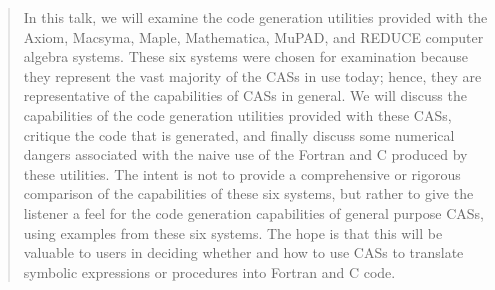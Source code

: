 \documentclass[11pt]{article}
\begin{document}
\begin{abstract}
In this talk, we will examine the code generation utilities provided with the
Axiom, Macsyma, Maple, Mathematica, MuPAD, and REDUCE computer algebra 
systems.  These six systems were chosen for examination because they 
represent the vast majority of the CASs in use 
today; hence, they are representative of the capabilities of
CASs in general.
We will discuss the capabilities of the code generation 
utilities provided with these CASs, critique the 
code that is generated, and finally discuss some numerical dangers 
associated with the naive use of the Fortran and C produced by these 
utilities.  The intent is not to provide a 
comprehensive or rigorous comparison of the capabilities of these six 
systems, but rather to give the listener a feel for the code generation 
capabilities of general purpose CASs, using 
examples from these six systems.  The hope is that this will be 
valuable to users in deciding whether and how to use
CASs to translate symbolic expressions or procedures into Fortran 
and C code.
\end{abstract}
\end{document}
